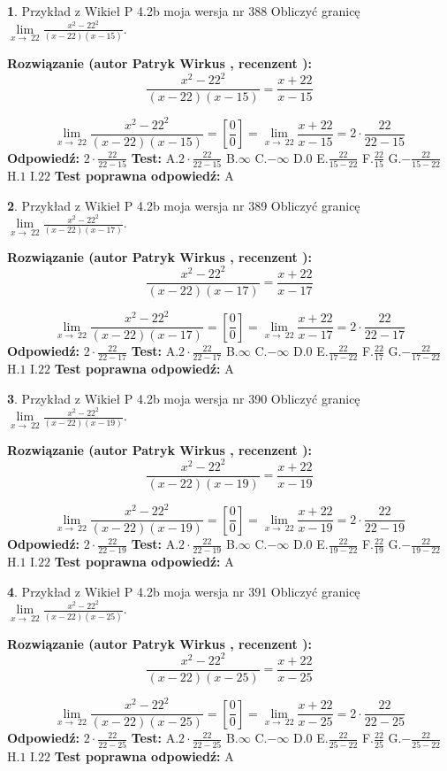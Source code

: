 \documentclass[12pt, a4paper]{article}
\theoremstyle{definition} %
\newtheorem{zad}{}
\newcommand{\zadStart}[1]{\begin{zad}#1\newline}
\newcommand{\zadStop}{\end{zad}}
\newcommand{\rozwStart}[2]{\noindent \textbf{Rozwiązanie (autor #1 , recenzent #2): }\newline}
\newcommand{\rozwStop}{\newline}
\newcommand{\odpStart}{\noindent \textbf{Odpowiedź:}\newline}
\newcommand{\odpStop}{\newline}
\newcommand{\testStart}{\noindent \textbf{Test:}\newline}
\newcommand{\testStop}{\newline}
\newcommand{\kluczStart}{\noindent \textbf{Test poprawna odpowiedź:}\newline}
\newcommand{\kluczStop}{\newline}
\begin{document}
\zadStart{Przykład z Wikieł P 4.2b moja wersja nr 388}
Obliczyć granicę $\lim\limits_{x\to\ 22}\frac{x^{2}-22^{2}}{(x-22)(x-15)}$.
\zadStop
\rozwStart{Patryk Wirkus}{}
$$\frac{x^{2}-22^{2}}{(x-22)(x-15)}=\frac{x+22}{x-15}$$

$$\lim\limits_{x\to\ 22}\frac{x^{2}-22^{2}}{(x-22)(x-15)}=[\frac{0}{0}]=\lim\limits_{x\to\ 22}\frac{x+22}{x-15}=2 \cdot \frac{22}{22-15}$$
\rozwStop
\odpStart
$2 \cdot \frac{22}{22-15}$
\odpStop
\testStart
A.$2 \cdot \frac{22}{22-15}$
B.$\infty$
C.$-\infty$
D.$0$
E.$\frac{22}{15-22}$
F.$\frac{22}{15}$
G.$-\frac{22}{15-22}$
H.$1$
I.$22$
\testStop
\kluczStart
A
\kluczStop



\zadStart{Przykład z Wikieł P 4.2b moja wersja nr 389}
Obliczyć granicę $\lim\limits_{x\to\ 22}\frac{x^{2}-22^{2}}{(x-22)(x-17)}$.
\zadStop
\rozwStart{Patryk Wirkus}{}
$$\frac{x^{2}-22^{2}}{(x-22)(x-17)}=\frac{x+22}{x-17}$$

$$\lim\limits_{x\to\ 22}\frac{x^{2}-22^{2}}{(x-22)(x-17)}=[\frac{0}{0}]=\lim\limits_{x\to\ 22}\frac{x+22}{x-17}=2 \cdot \frac{22}{22-17}$$
\rozwStop
\odpStart
$2 \cdot \frac{22}{22-17}$
\odpStop
\testStart
A.$2 \cdot \frac{22}{22-17}$
B.$\infty$
C.$-\infty$
D.$0$
E.$\frac{22}{17-22}$
F.$\frac{22}{17}$
G.$-\frac{22}{17-22}$
H.$1$
I.$22$
\testStop
\kluczStart
A
\kluczStop



\zadStart{Przykład z Wikieł P 4.2b moja wersja nr 390}
Obliczyć granicę $\lim\limits_{x\to\ 22}\frac{x^{2}-22^{2}}{(x-22)(x-19)}$.
\zadStop
\rozwStart{Patryk Wirkus}{}
$$\frac{x^{2}-22^{2}}{(x-22)(x-19)}=\frac{x+22}{x-19}$$

$$\lim\limits_{x\to\ 22}\frac{x^{2}-22^{2}}{(x-22)(x-19)}=[\frac{0}{0}]=\lim\limits_{x\to\ 22}\frac{x+22}{x-19}=2 \cdot \frac{22}{22-19}$$
\rozwStop
\odpStart
$2 \cdot \frac{22}{22-19}$
\odpStop
\testStart
A.$2 \cdot \frac{22}{22-19}$
B.$\infty$
C.$-\infty$
D.$0$
E.$\frac{22}{19-22}$
F.$\frac{22}{19}$
G.$-\frac{22}{19-22}$
H.$1$
I.$22$
\testStop
\kluczStart
A
\kluczStop



\zadStart{Przykład z Wikieł P 4.2b moja wersja nr 391}
Obliczyć granicę $\lim\limits_{x\to\ 22}\frac{x^{2}-22^{2}}{(x-22)(x-25)}$.
\zadStop
\rozwStart{Patryk Wirkus}{}
$$\frac{x^{2}-22^{2}}{(x-22)(x-25)}=\frac{x+22}{x-25}$$

$$\lim\limits_{x\to\ 22}\frac{x^{2}-22^{2}}{(x-22)(x-25)}=[\frac{0}{0}]=\lim\limits_{x\to\ 22}\frac{x+22}{x-25}=2 \cdot \frac{22}{22-25}$$
\rozwStop
\odpStart
$2 \cdot \frac{22}{22-25}$
\odpStop
\testStart
A.$2 \cdot \frac{22}{22-25}$
B.$\infty$
C.$-\infty$
D.$0$
E.$\frac{22}{25-22}$
F.$\frac{22}{25}$
G.$-\frac{22}{25-22}$
H.$1$
I.$22$
\testStop
\kluczStart
A
\kluczStop
\end{document}
